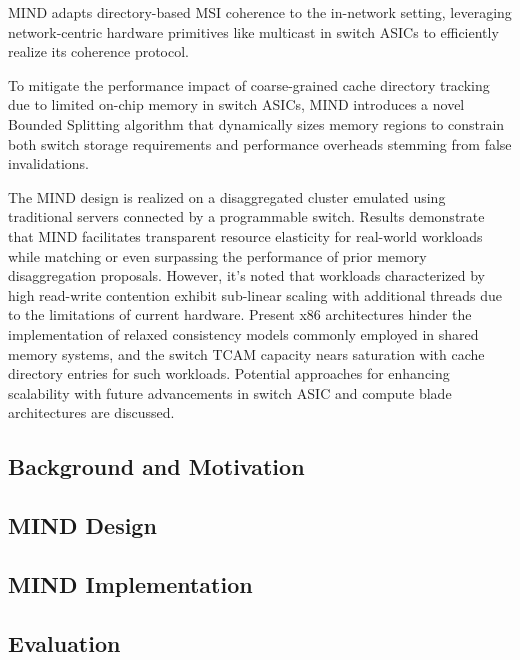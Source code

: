 MIND adapts directory-based MSI coherence to the in-network setting, leveraging network-centric hardware primitives like multicast in switch ASICs to efficiently realize its coherence protocol.

To mitigate the performance impact of coarse-grained cache directory tracking due to limited on-chip memory in switch ASICs, MIND introduces a novel Bounded Splitting algorithm that dynamically sizes memory regions to constrain both switch storage requirements and performance overheads stemming from false invalidations.

The MIND design is realized on a disaggregated cluster emulated using traditional servers connected by a programmable switch. Results demonstrate that MIND facilitates transparent resource elasticity for real-world workloads while matching or even surpassing the performance of prior memory disaggregation proposals. However, it's noted that workloads characterized by high read-write contention exhibit sub-linear scaling with additional threads due to the limitations of current hardware. Present x86 architectures hinder the implementation of relaxed consistency models commonly employed in shared memory systems, and the switch TCAM capacity nears saturation with cache directory entries for such workloads. Potential approaches for enhancing scalability with future advancements in switch ASIC and compute blade architectures are discussed.
\subsection{Background and Motivation}
\subsection{MIND Design}
\subsection{MIND Implementation}
\subsection{Evaluation}

